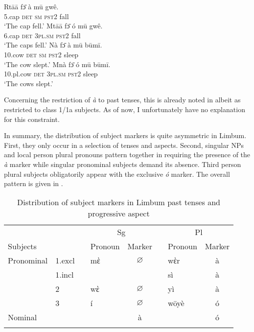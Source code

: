 \documentclass[output=paper]{langscibook}
\begin{document}
\ea\label{ex:johanneshein:nounclasses}
\begin{xlist}
\ex 
\gll Rtāā fɔ̄ à mū gwê.\\
5.cap \textsc{det} \textsc{sm} \textsc{pst2} fall\\
\glt `The cap fell.'
\ex
\gll Mtāā fɔ̄ ó mū gwê.\\
6.cap \textsc{det} \textsc{3pl.sm} \textsc{pst2} fall\\
\glt `The caps fell.'
\ex 
\gll Nà fɔ̄ à mū būmī.\\
10.cow \textsc{det} \textsc{sm} \textsc{pst2} sleep\\
\glt `The cow slept.'
\ex 
\gll Mnà fɔ̄ ó mū būmī.\\
10.pl.cow \textsc{det} \textsc{3pl.sm} \textsc{pst2} sleep\\
\glt `The cows slept.'
\end{xlist}
\z
Concerning the restriction of \textit{à} to past tenses, this is already noted in \citet[][§10.2]{fransen95} albeit as restricted to class 1/1a subjects. As of now, I unfortunately have no explanation for this constraint.

In summary, the distribution of subject markers is quite asymmetric in
Limbum. First, they only occur in a selection of tenses and
aspects. Second, singular NPs and local person plural pronouns pattern
together in requiring the presence of the \textit{à} marker while
singular pronominal subjects demand its absence. Third person plural
subjects obligatorily appear with the exclusive \textit{ó}
marker. The overall pattern is given in .

\begin{table}
\caption{Distribution of subject markers in Limbum past tenses and progressive aspect}
\label{tab:johanneshein:SMdistro}
\begin{tabular}{llllcllc}
  \lsptoprule
  &&&\multicolumn{2}{c}{Sg}&&\multicolumn{2}{c}{Pl}\\
  \cmidrule{4-5}\cmidrule{7-8}
  Subjects&&&Pronoun&Marker&&Pronoun&Marker\\
  \midrule
  Pronominal&1.excl&&mὲ&$\varnothing$&&wὲr&à\\
  &1.incl&&&&&sì&à\\
  &2&&wὲ&$\varnothing$&&yì&à\\
  &3&&í&$\varnothing$&&wōyè&ó\\
  \midrule
  Nominal&&&&à&&&ó\\
  \lspbottomrule
\end{tabular}
\end{table}
\end{document}
